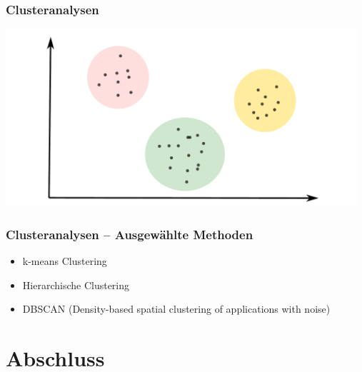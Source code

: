 \documentclass[aspectratio=169]{beamer}
\begin{document}
\begin{frame}
  \frametitle{Clusteranalysen}
  \begin{center}
    \includegraphics[width=13.0cm]{images/clustering_2.pdf}
  \end{center}  
\end{frame}

\begin{frame}
  \frametitle{Clusteranalysen -- Ausgewählte Methoden}
  \begin{block}{}
    \begin{center}
      \begin{itemize}
      \item k-means Clustering
      \item Hierarchische Clustering
      \item DBSCAN (Density-based spatial clustering of applications
        with noise)
      \end{itemize}
    \end{center}
  \end{block}
\end{frame}

\section{Abschluss}

\begin{frame}{}
   \tableofcontents[currentsection]
\end{frame}
\end{document}
